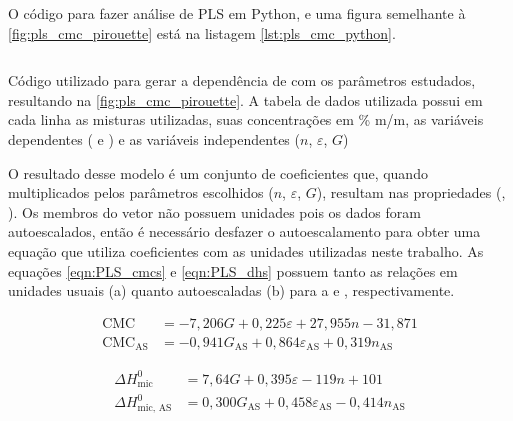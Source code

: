 		O código para fazer análise de PLS em Python, e uma figura semelhante à \autoref{fig:pls_cmc_pirouette} está na listagem \ref{lst:pls_cmc_python}.
		
		\begin{listing}[h]
			\inputminted{python}{./python/pls_cmc_sklearn.py}
			\caption{Código utilizado para gerar a dependência de \cmc{} com os parâmetros estudados, resultando na \autoref{fig:pls_cmc_pirouette}. A tabela de dados utilizada possui em cada linha as misturas utilizadas, suas concentrações em \% m/m, as variáveis dependentes (\cmc{} e \DHmic) e as variáveis independentes (\(n\), \(\varepsilon\), \(G\))}
			\label{lst:pls_cmc_python}
		\end{listing}
		
		O resultado desse modelo é um conjunto de coeficientes que, quando multiplicados pelos parâmetros escolhidos (\(n\), \(\varepsilon\), \(G\)), resultam nas propriedades (\cmc, \DHmic). Os membros do vetor não possuem unidades pois os dados foram autoescalados, então é necessário desfazer o autoescalamento para obter uma equação que utiliza coeficientes com as unidades utilizadas neste trabalho. As equações \ref{eqn:PLS_cmcs} e \ref{eqn:PLS_dhs} possuem tanto as relações em unidades usuais (a) quanto autoescaladas (b) para a \cmc{} e \DHmic, respectivamente. %
				
		\begin{subequations}
			\begin{align}
				\textrm{CMC}               & = -7,206G              + 0,225\varepsilon             + 27,955n            - 31,871  \label{eqn:PLS_cmc}     \\
				\textrm{CMC}_{\textrm{AS}} & = -0,941G_\textrm{AS}  + 0,864\varepsilon_\textrm{AS} + 0,319n_\textrm{AS}           \label{eqn:PLS_cmc_AS}
			\end{align}
			\label{eqn:PLS_cmcs}
		\end{subequations}
		
		\begin{subequations}
			\begin{align}
				\Delta H_\textrm{mic}^0     &= 7,64G              + 0,395\varepsilon             - 119n                + 101  \label{eqn:PLS_dh} \\
				\Delta H_\textrm{mic, AS}^0 &= 0,300G_\textrm{AS} + 0,458\varepsilon_\textrm{AS} - 0,414n_\textrm{AS}         \label{eqn:PLS_dh_AS}
			\end{align}
			\label{eqn:PLS_dhs}
		\end{subequations}
		
